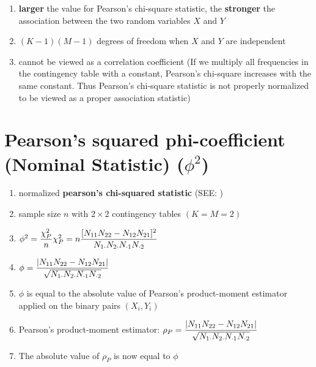 \begin{enumerate}
    \item \textbf{larger} the value for Pearson’s chi-square statistic, the \textbf{stronger} the association between the two random variables $X$ and $Y$

    \item $(K - 1)(M - 1)$ degrees of freedom when $X$ and $Y$ are independent

    \item cannot be viewed as a correlation coefficient (If we multiply all frequencies in the contingency table with a constant, Pearson’s chi-square increases with the same constant. Thus Pearson’s chi-square statistic is not properly normalized to be viewed as a proper association statistic)

\end{enumerate}


\section{Pearson’s squared phi-coefficient (Nominal Statistic) ($\phi^2$) \cite{ism-1}} \label{Multivariate Distributions: Pearson’s squared phi-coefficient (Nominal Statistic)}

\begin{enumerate}
    \item normalized \textbf{pearson’s chi-squared statistic} (SEE: )

    \item sample size $n$ with $2 \times  2$ contingency tables $(K = M = 2)$

    \item $
        \hfill
        \phi^2 = \dfrac{\chi_P^2}{n}
        \hfill
        \chi_P^2 = n \dfrac{
            [N_{11}N_{22} - N_{12}N_{21}]^2
        }{
            N_{1\cdot}N_{2\cdot}N_{\cdot 1}N_{\cdot 2}
        }
        \hfill
    $

    \item $
        \hfill
        \phi = \dfrac{
            \dabs{N_{11}N_{22} - N_{12}N_{21}}
        }{
            \sqrt{N_{1\cdot}N_{2\cdot}N_{\cdot 1}N_{\cdot 2}}
        }
        \hfill
    $

    \item $\phi$ is equal to the absolute value of Pearson’s product-moment estimator applied on the binary pairs $(X_i, Y_i)$

    \item Pearson’s product-moment estimator: $
        \hfill
        \rho_P = \dfrac{
            \dabs{N_{11}N_{22} - N_{12}N_{21}}
        }{
            \sqrt{N_{1\cdot}N_{2\cdot}N_{\cdot 1}N_{\cdot 2}}
        }
        \hfill
    $

    \item The absolute value of $\rho_P$ is now equal to $\phi$
\end{enumerate}


